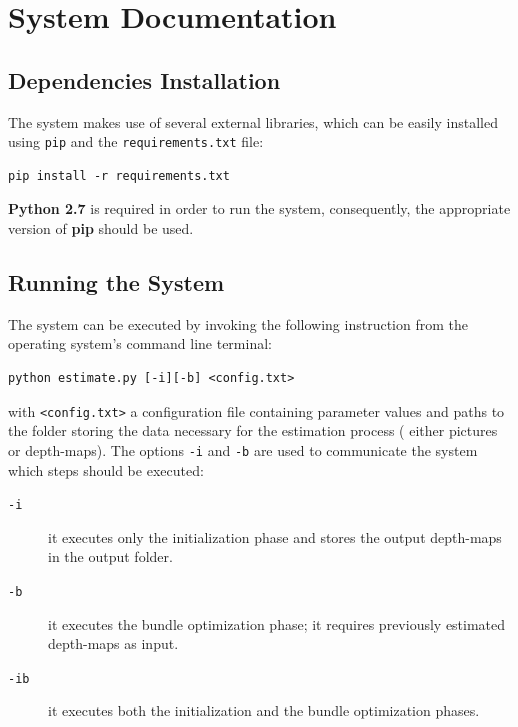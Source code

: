 \documentclass[notitlepage,english]{hgbreport}
\begin{document}
\chapter{System Documentation}
\newcommand{\ComputeEnergy}{\texttt{compute\_energy}}
\newcommand{\Estimate}{\texttt{estimate}}
\newcommand{\Lbp}{\texttt{lbp}}
\newcommand{\Utils}{\texttt{utils}}
\newcommand{\Params}{\texttt{params}}

\section{Dependencies Installation}
The system makes use of several external libraries, which can be easily installed using \texttt{pip} and the \texttt{requirements.txt} file:
\begin{lstlisting}[stepnumber=0]
pip install -r requirements.txt
\end{lstlisting}
\begin{tcolorbox}[title=Note:]
\textbf{Python 2.7} is required in order to run the system, consequently, the appropriate version of \textbf{pip} should be used. 
\end{tcolorbox}


\section{Running the System}
The system can be executed by invoking the following instruction from the operating system's command line terminal:
\begin{lstlisting}[stepnumber=0]
	python estimate.py [-i][-b] <config.txt>
\end{lstlisting}
with \texttt{<config.txt>} a configuration file containing parameter values and paths to the folder storing the data necessary for the estimation process (\ie{} either pictures or depth-maps).
The options \texttt{-i} and \texttt{-b} are used to communicate the system which steps should be executed:
\begin{description}
	\item[\texttt{-i}] it executes only the initialization phase and stores the output depth-maps in the output folder.
	\item[\texttt{-b}] it executes the bundle optimization phase; it requires previously estimated depth-maps as input. 
	\item[\texttt{-ib}] it executes both the initialization and the bundle optimization phases.
\end{description}
\end{document}
